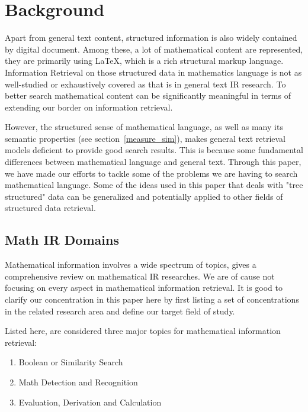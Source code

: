 \chapter{Background}
Apart from general text content, structured information is also widely contained by digital document. 
Among these, a lot of mathematical content are represented, they are primarily using \LaTeX, which is a rich structural markup language. 
Information Retrieval on those structured data in mathematics language is not as well-studied or exhaustively covered as that is in general text IR research. 
To better search mathematical content can be significantly meaningful in terms of extending our border on information retrieval.


However, the structured sense of mathematical language, as well as many its semantic properties (see section~\ref{measure_sim}), makes general text retrieval models deficient to provide good search results. 
This is because some fundamental differences between mathematical language and general text.
Through this paper, we have made our efforts to tackle some of the problems we are having to search mathematical language. 
Some of the ideas used in this paper that deals with "tree structured" data can be generalized and potentially applied to other fields of structured data retrieval. 

\section{Math IR Domains}

Mathematical information involves a wide spectrum of topics, 
\cite{goodsurvey} gives a comprehensive review on mathematical IR researches.
We are of cause not focusing on every aspect in mathematical information retrieval. 
It is good to clarify our concentration in this paper here by first listing a set of concentrations in the related research area and define our target field of study.

\pagebreak
Listed here, are considered three major topics for mathematical information retrieval:

\begin{enumerate}
\item Boolean or Similarity Search
\item Math Detection and Recognition
\item Evaluation, Derivation and Calculation
\end{enumerate}

